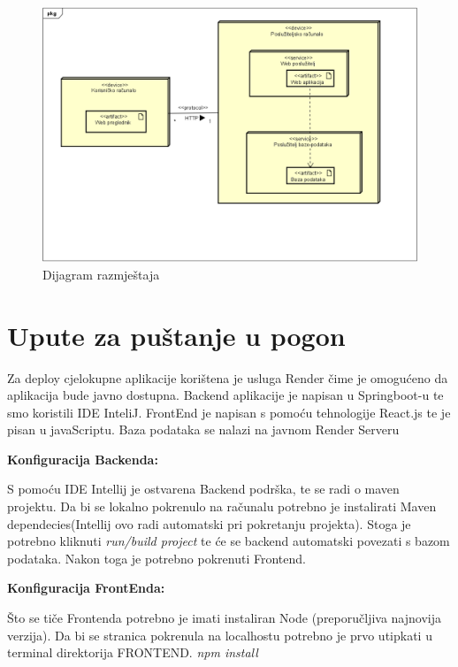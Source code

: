 			\begin{figure}[H]
				\includegraphics[width=\textwidth]{dijagrami/DijagramRazmjestaja.PNG} %
				\centering
				\caption{Dijagram razmještaja}
				\label{fig:diagrazmjestaja}
			\end{figure}
			
			
			\eject 
		
		\section{Upute za puštanje u pogon}
		
			
            Za deploy cjelokupne aplikacije 	korištena je usluga Render čime je omogućeno da aplikacija bude javno dostupna. Backend aplikacije je napisan u Springboot-u te smo koristili IDE InteliJ.  FrontEnd je napisan s pomoću tehnologije React.js te je pisan u javaScriptu. Baza podataka se nalazi na javnom Render Serveru

            \textbf{Konfiguracija Backenda:}
            
            S pomoću IDE Intellij je ostvarena Backend podrška, te se radi o maven projektu.
            Da bi se lokalno pokrenulo na računalu potrebno je instalirati Maven dependecies(Intellij ovo radi automatski pri pokretanju projekta).
            Stoga je potrebno kliknuti \textit{run/build project} te će se backend automatski povezati s bazom podataka.
            Nakon toga je potrebno pokrenuti Frontend.

            \textbf{Konfiguracija FrontEnda:}
            
            Što se tiče Frontenda potrebno je imati instaliran Node (preporučljiva najnovija verzija). 
            Da bi se stranica pokrenula na localhostu potrebno je prvo utipkati u terminal direktorija FRONTEND. 
                \textit{npm install}
            \eject
			
